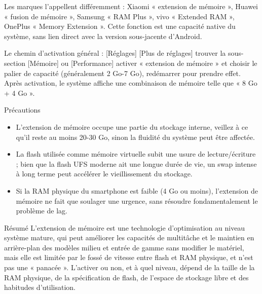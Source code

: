 Les marques l'appellent différemment : Xiaomi « extension de mémoire », Huawei « fusion de mémoire », Samsung « RAM Plus », vivo « Extended RAM », OnePlus « Memory Extension ». Cette fonction est une capacité native du système, sans lien direct avec la version sous-jacente d'Android.

Le chemin d'activation général : [Réglages] [Plus de réglages] trouver la sous-section [Mémoire] ou [Performance] activer « extension de mémoire » et choisir le palier de capacité (généralement 2 Go-7 Go), redémarrer pour prendre effet. Après activation, le système affiche une combinaison de mémoire telle que « 8 Go + 4 Go ».

\begin{tcbwarn}{Précautions}
\begin{itemize}
  \item L'extension de mémoire occupe une partie du stockage interne, veillez à ce qu'il reste au moins 20-30 Go, sinon la fluidité du système peut être affectée.
  \item La flash utilisée comme mémoire virtuelle subit une usure de lecture/écriture ; bien que la flash UFS moderne ait une longue durée de vie, un swap intense à long terme peut accélérer le vieillissement du stockage.
  \item Si la RAM physique du smartphone est faible (4 Go ou moins), l'extension de mémoire ne fait que soulager une urgence, sans résoudre fondamentalement le problème de lag.
\end{itemize}

\end{tcbwarn}

\begin{tcbinfo}{Résumé}
L'extension de mémoire est une technologie d'optimisation au niveau système mature, qui peut améliorer les capacités de multitâche et le maintien en arrière-plan des modèles milieu et entrée de gamme sans modifier le matériel, mais elle est limitée par le fossé de vitesse entre flash et RAM physique, et n'est pas une « panacée ». L'activer ou non, et à quel niveau, dépend de la taille de la RAM physique, de la spécification de flash, de l'espace de stockage libre et des habitudes d'utilisation.

\end{tcbinfo}

